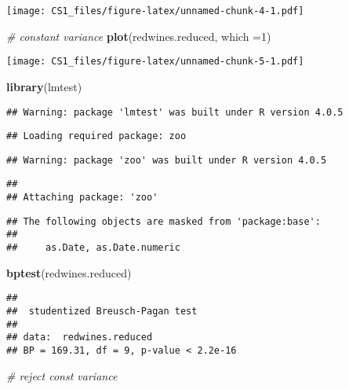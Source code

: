 \documentclass[
]{article}
\newenvironment{Shaded}{\begin{snugshade}}{\end{snugshade}}
\newcommand{\CommentTok}[1]{\textcolor[rgb]{0.56,0.35,0.01}{\textit{#1}}}
\newcommand{\DataTypeTok}[1]{\textcolor[rgb]{0.13,0.29,0.53}{#1}}
\newcommand{\DecValTok}[1]{\textcolor[rgb]{0.00,0.00,0.81}{#1}}
\newcommand{\KeywordTok}[1]{\textcolor[rgb]{0.13,0.29,0.53}{\textbf{#1}}}
\newcommand{\NormalTok}[1]{#1}
\begin{document}
\texttt{[image: CS1\_files/figure-latex/unnamed-chunk-4-1.pdf]}

\begin{Shaded}
\begin{Highlighting}[]
\CommentTok{# constant variance}
\KeywordTok{plot}\NormalTok{(redwines.reduced, }\DataTypeTok{which =}\DecValTok{1}\NormalTok{)}
\end{Highlighting}
\end{Shaded}

\texttt{[image: CS1\_files/figure-latex/unnamed-chunk-5-1.pdf]}

\begin{Shaded}
\begin{Highlighting}[]
\KeywordTok{library}\NormalTok{(lmtest)}
\end{Highlighting}
\end{Shaded}

\begin{verbatim}
## Warning: package 'lmtest' was built under R version 4.0.5
\end{verbatim}

\begin{verbatim}
## Loading required package: zoo
\end{verbatim}

\begin{verbatim}
## Warning: package 'zoo' was built under R version 4.0.5
\end{verbatim}

\begin{verbatim}
## 
## Attaching package: 'zoo'
\end{verbatim}

\begin{verbatim}
## The following objects are masked from 'package:base':
## 
##     as.Date, as.Date.numeric
\end{verbatim}

\begin{Shaded}
\begin{Highlighting}[]
\KeywordTok{bptest}\NormalTok{(redwines.reduced)}
\end{Highlighting}
\end{Shaded}

\begin{verbatim}
## 
##  studentized Breusch-Pagan test
## 
## data:  redwines.reduced
## BP = 169.31, df = 9, p-value < 2.2e-16
\end{verbatim}

\begin{Shaded}
\begin{Highlighting}[]
\CommentTok{# reject const variance}
\end{Highlighting}
\end{Shaded}
\end{document}
